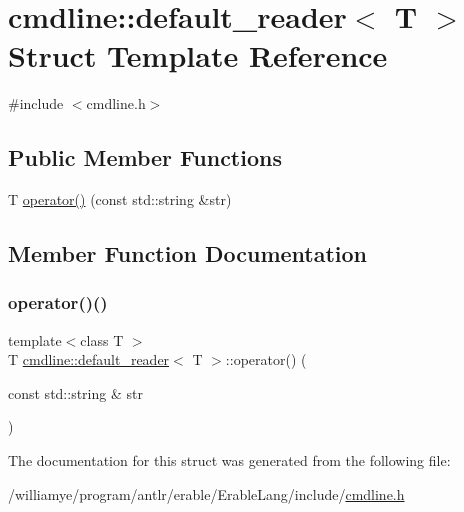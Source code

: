 \hypertarget{structcmdline_1_1default__reader}{}\section{cmdline\+::default\+\_\+reader$<$ T $>$ Struct Template Reference}
\label{structcmdline_1_1default__reader}


{\ttfamily \#include $<$cmdline.\+h$>$}

\subsection*{Public Member Functions}
\begin{DoxyCompactItemize}
\item 
T \mbox{\hyperlink{structcmdline_1_1default__reader_a71f97c64added8d907fb95c0e5fe1f6f}{operator()}} (const std\+::string \&str)
\end{DoxyCompactItemize}


\subsection{Member Function Documentation}
\mbox{\label{structcmdline_1_1default__reader_a71f97c64added8d907fb95c0e5fe1f6f}} 
\subsubsection{\texorpdfstring{operator()()}{operator()()}}
{\footnotesize\ttfamily template$<$class T $>$ \\
T \mbox{\hyperlink{structcmdline_1_1default__reader}{cmdline\+::default\+\_\+reader}}$<$ T $>$\+::operator() (\begin{DoxyParamCaption}\item[{const std\+::string \&}]{str }\end{DoxyParamCaption})\hspace{0.3cm}{\ttfamily [inline]}}



The documentation for this struct was generated from the following file\+:\begin{DoxyCompactItemize}
\item 
/williamye/program/antlr/erable/\+Erable\+Lang/include/\mbox{\hyperlink{cmdline_8h}{cmdline.\+h}}\end{DoxyCompactItemize}
